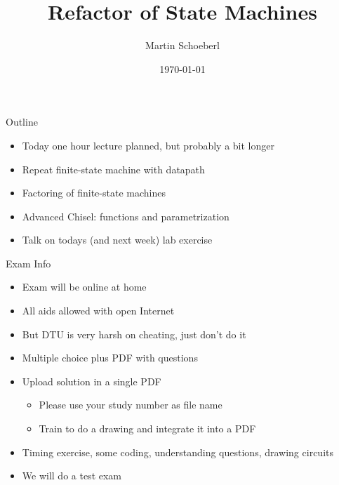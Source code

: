 

\newif\ifbook


\title{Refactor of State Machines}
\author{Martin Schoeberl}
\date{\today}



\begin{frame}
\titlepage
\end{frame}

\begin{frame}[fragile]{Outline}
\begin{itemize}
\item Today one hour lecture planned, but probably a bit longer
\item Repeat finite-state machine with datapath
\item Factoring of finite-state machines
\item Advanced Chisel: functions and parametrization
\item Talk on todays (and next week) lab exercise
\end{itemize}
\end{frame}

\begin{frame}[fragile]{Exam Info}
\begin{itemize}
\item Exam will be online at home
\item All aids allowed with open Internet
\item But DTU is very harsh on cheating, just don't do it
\item Multiple choice plus PDF with questions
\item Upload solution in a single PDF
\begin{itemize}
\item Please use your study number as file name
\item Train to do a drawing and integrate it into a PDF
\end{itemize}
\item Timing exercise, some coding, understanding questions, drawing circuits
\item We will do a test exam
\end{itemize}
\end{frame}

